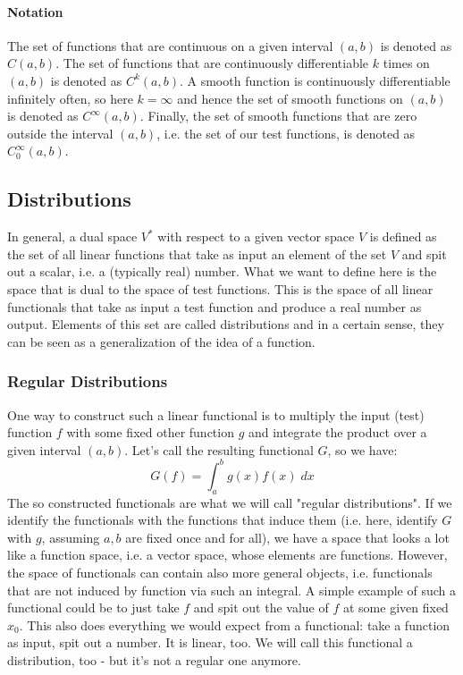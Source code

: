 \paragraph{Notation}
The set of functions that are continuous on a given interval $(a,b)$ is denoted as $C(a,b)$. The set of functions that are continuously differentiable $k$ times on $(a,b)$ is denoted as $C^k(a,b)$. A smooth function is continuously differentiable infinitely often, so here $k = \infty$ and hence the set of smooth functions on $(a,b)$ is denoted as $C^{\infty}(a,b)$. Finally, the set of smooth functions that are zero outside the interval $(a,b)$, i.e. the set of our test functions, is denoted as  $C_0^{\infty}(a,b)$.


\subsection{Distributions}
In general, a dual space $V^*$ with respect to a given vector space $V$ is defined as the set of all linear functions that take as input an element of the set $V$ and spit out a scalar, i.e. a (typically real) number. What we want to define here is the space that is dual to the space of test functions. This is the space of all linear functionals that take as input a test function and produce a real number as output. Elements of this set are called distributions and in a certain sense, they can be seen as a generalization of the idea of a function. 

\subsubsection{Regular Distributions}
One way to construct such a linear functional is to multiply the input (test) function $f$ with some fixed other function $g$ and integrate the product over a given interval $(a,b)$. Let's call the resulting functional $G$, so we have:
\begin{equation}
 G(f) = \int_a^b g(x) f(x) \; dx
\end{equation}
The so constructed functionals are what we will call "regular distributions". If we identify the functionals with the functions that induce them (i.e. here, identify $G$ with $g$, assuming $a,b$ are fixed once and for all), we have a space that looks a lot like a function space, i.e. a vector space, whose elements are functions. However, the space of functionals can contain also more general objects, i.e. functionals that are not induced by function via such an integral. A simple example of such a functional could be to just take $f$ and spit out the value of $f$ at some given fixed $x_0$. This also does everything we would expect from a functional: take a function as input, spit out a number. It is linear, too. We will call this functional a distribution, too - but it's not a regular one anymore.

